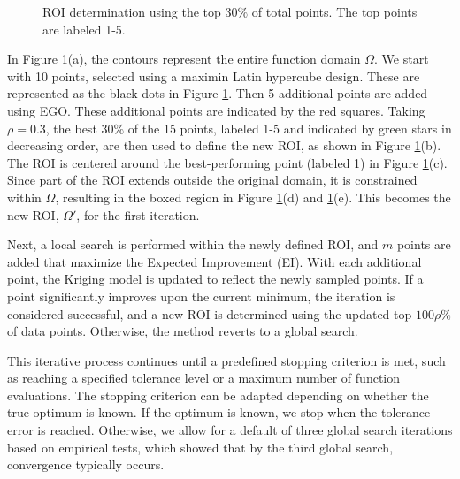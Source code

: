 \documentclass [PhD] {package/uclathes}
\begin{document}
\begin{figure}
    \quad
    \caption{ROI determination using the top \(30\%\) of total points. The {top}  points are labeled 1-5.}
    \label{fig:roi}%
\end{figure}


In Figure \ref{fig:roi}(a), the contours represent the entire function domain \(\Omega\). We start with 10 points, selected using a maximin Latin hypercube design. These are represented as the black dots in Figure \ref{fig:roi}. Then 5 additional points are added using EGO. These additional points are indicated by the red squares. Taking $\rho=0.3$, the best $30\%$ of the 15 points, labeled 1-5 and indicated by green stars in decreasing order, are then used to define the new ROI, as shown in Figure \ref{fig:roi}(b). The ROI is centered around the best-performing point (labeled 1) in Figure \ref{fig:roi}(c). Since part of the ROI extends outside the original domain, it is constrained within \(\Omega\), resulting in the boxed region in Figure \ref{fig:roi}(d) and \ref{fig:roi}(e). This becomes the new ROI, \(\Omega'\), for the first iteration.

Next, a local search is performed within the newly defined ROI, and $m$ points are added that maximize the Expected Improvement (EI). With each additional point, the Kriging model is updated to reflect the newly sampled points. If a point significantly improves upon the current minimum, the iteration is considered successful, and a new ROI is determined using the updated top $100\rho\%$ of data points. Otherwise, the method reverts to a global search.

This iterative process continues until a predefined stopping criterion is met, such as reaching a specified tolerance level or a maximum number of function evaluations. The stopping criterion can be adapted depending on whether the true optimum is known. If the optimum is known, we stop when the tolerance error is reached. Otherwise, we allow for a default of three global search iterations based on empirical tests, which showed that by the third global search, convergence typically occurs.
\end{document}
